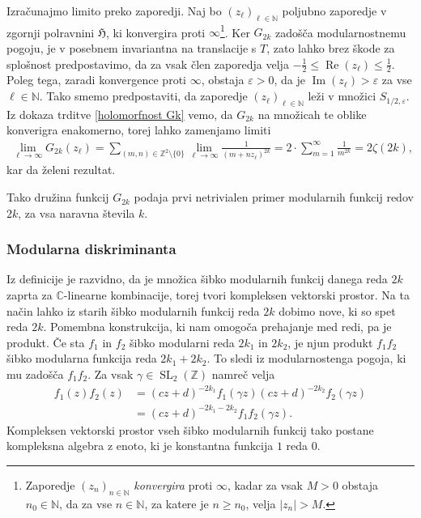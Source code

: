 \documentclass[mat1]{fmfdelo}
\numberwithin{equation}{section}
\newcommand{\N}{\mathbb N}
\newcommand{\Z}{\mathbb Z}
\newcommand{\C}{\mathbb C}
\newcommand{\HH}{\mathfrak{H}}
\newcommand{\SL}{\operatorname{SL}_2(\Z)}
\newcommand{\abs}[1]{\left\lvert #1 \right\rvert}
\renewcommand\Re{\operatorname{Re}}%
\renewcommand\Im{\operatorname{Im}}%
\theoremstyle{definition}
\begin{document}
\begin{dokaz}
    Izračunajmo limito preko zaporedji. Naj bo $(z_\ell)_{\ell\in\N}$ poljubno zaporedje v zgornji polravnini $\HH$, ki konvergira proti $\infty$\footnote{Zaporedje $(z_n)_{n \in \N}$ \emph{konvergira} proti $\infty$, kadar za vsak $M > 0$ obstaja $n_0 \in \N$, da za vse $n \in \N$, za katere je $n \geq n_0$, velja $\abs{z_n} > M$.}. Ker $G_{2k}$ zadošča modularnostnemu pogoju, je v posebnem invariantna na translacije s $T$, zato lahko brez škode za splošnost predpostavimo, da za vsak člen zaporedja velja $-\frac12 \leq \Re(z_\ell) \leq \frac12$. Poleg tega, zaradi konvergence proti $\infty$, obstaja $\varepsilon > 0$, da je $\Im(z_\ell) > \varepsilon$ za vse $\ell \in \N$.  Tako smemo predpostaviti, da zaporedje $(z_\ell)_{\ell \in\N}$ leži v množici $S_{1/2, \varepsilon}$. Iz dokaza trditve \ref{holomorfnost Gk} vemo, da $G_{2k}$ na množicah te oblike konverigra enakomerno, torej lahko zamenjamo limiti
    \begin{gather*}
        \lim_{\ell \to \infty}G_{2k}(z_\ell) = 
        \sum_{(m,n) \in \Z^2\setminus\{0\}} \lim_{\ell \to \infty} \frac{1}{(m + nz_\ell)^{2k}} = 
        2 \cdot \sum_{m = 1}^\infty \frac{1}{m^{2k}} = 2\zeta(2k),
    \end{gather*}
    kar da želeni rezultat.
\end{dokaz}

Tako družina funkcij $G_{2k}$ podaja prvi netrivialen primer modularnih funkcij redov $2k$, za vsa naravna števila $k$.


\subsubsection*{Modularna diskriminanta}
Iz definicije je razvidno, da je množica šibko modularnih funkcij danega reda $2k$ zaprta za $\C$-linearne kombinacije, torej tvori kompleksen vektorski prostor. Na ta način lahko iz starih šibko modularnih funkcij reda $2k$ dobimo nove, ki so spet reda $2k$. Pomembna konstrukcija, ki nam omogoča prehajanje med redi, pa je produkt. Če sta $f_1$ in $f_2$ šibko modularni reda $2k_1$ in $2k_2$, je njun produkt $f_1f_2$ šibko modularna funkcija reda $2k_1 + 2k_2$. To sledi iz modularnostenga pogoja, ki mu zadošča $f_1f_2$. Za vsak $\gamma \in \SL$ namreč velja
\begin{align*}
    f_1(z)f_2(z) &= 
    (cz + d)^{-2k_1} f_1\left(\gamma z\right)(cz + d)^{-2k_2} f_2\left(\gamma z\right) \\
    &= (cz + d)^{-2k_1 - 2k_2} f_1f_2\left(\gamma z\right).
\end{align*}
Kompleksen vektorski prostor vseh šibko modularnih funkcij tako postane kompleksna algebra z enoto, ki je konstantna funkcija $1$ reda $0$.
\end{document}

